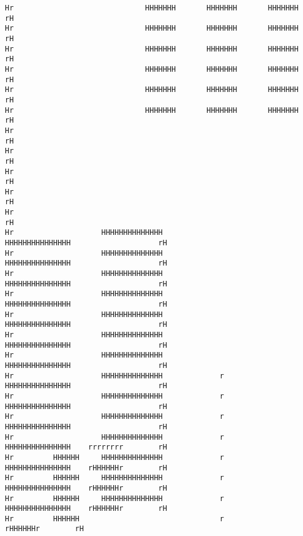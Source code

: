 \documentclass[10pt,a4paper]{article}
\begin{document}
{\begin{verbatim}
Hr                              HHHHHHH       HHHHHHH       HHHHHHH                               rH
Hr                              HHHHHHH       HHHHHHH       HHHHHHH                               rH
Hr                              HHHHHHH       HHHHHHH       HHHHHHH                               rH
Hr                              HHHHHHH       HHHHHHH       HHHHHHH                               rH
Hr                              HHHHHHH       HHHHHHH       HHHHHHH                               rH
Hr                              HHHHHHH       HHHHHHH       HHHHHHH                               rH
Hr                                                                                                rH
Hr                                                                                                rH
Hr                                                                                                rH
Hr                                                                                                rH
Hr                                                                                                rH
Hr                    HHHHHHHHHHHHHH                           HHHHHHHHHHHHHHH                    rH
Hr                    HHHHHHHHHHHHHH                           HHHHHHHHHHHHHHH                    rH
Hr                    HHHHHHHHHHHHHH                           HHHHHHHHHHHHHHH                    rH
Hr                    HHHHHHHHHHHHHH                           HHHHHHHHHHHHHHH                    rH
Hr                    HHHHHHHHHHHHHH                           HHHHHHHHHHHHHHH                    rH
Hr                    HHHHHHHHHHHHHH                           HHHHHHHHHHHHHHH                    rH
Hr                    HHHHHHHHHHHHHH                           HHHHHHHHHHHHHHH                    rH
Hr                    HHHHHHHHHHHHHH             r             HHHHHHHHHHHHHHH                    rH
Hr                    HHHHHHHHHHHHHH             r             HHHHHHHHHHHHHHH                    rH
Hr                    HHHHHHHHHHHHHH             r             HHHHHHHHHHHHHHH                    rH
Hr                    HHHHHHHHHHHHHH             r             HHHHHHHHHHHHHHH    rrrrrrrr        rH
Hr         HHHHHH     HHHHHHHHHHHHHH             r             HHHHHHHHHHHHHHH    rHHHHHHr        rH
Hr         HHHHHH     HHHHHHHHHHHHHH             r             HHHHHHHHHHHHHHH    rHHHHHHr        rH
Hr         HHHHHH     HHHHHHHHHHHHHH             r             HHHHHHHHHHHHHHH    rHHHHHHr        rH
Hr         HHHHHH                                r                                rHHHHHHr        rH

\end{verbatim}}
\end{document}
